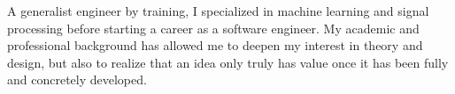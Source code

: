 

\begin{cvparagraph}
	A generalist engineer by training, I specialized in machine learning and signal processing before starting a career as a software engineer. My academic and professional background has allowed me to deepen my interest in theory and design, but also to realize that an idea only truly has value once it has been fully and concretely developed.
\end{cvparagraph}
